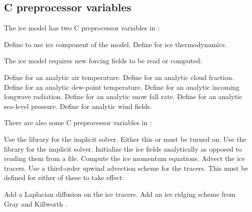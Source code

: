 \subsection{C preprocessor variables}
The ice model has two C preprocessor variables in :
\begin{klist}
   Define to use ice component of the model.
   Define for ice thermodynamics.
\end{klist}

The ice model requires new forcing fields to be read or computed:
\begin{klist}
     Define for an analytic air temperature.
    Define for an analytic cloud fraction.
     Define for an analytic dew-point temperature.
   Define for an analytic incoming longwave
radiation.
     Define for an analytic snow fall rate.
      Define for an analytic sea-level pressure.
     Define for analytic wind fields.
\end{klist}

There are also some C preprocessor variables in :
\begin{klist}
    Use the  library for the implicit solver.
Either this or  must be turned on.
    Use the  library for the implicit solver.
    Initialize the ice fields analytically as
opposed to reading them from a file.
    Compute the ice momentum equations.
    Advect the ice tracers.
     Use a third-order upwind advection scheme for
the tracers. This must be defined for either of these to take effect:
    \begin{klist}
        Add a Laplacian diffusion on the ice
     tracers.
        Add an ice ridging scheme from Gray and
     Killworth \cite{Gray95}.
    \end{klist}
\end{klist}

